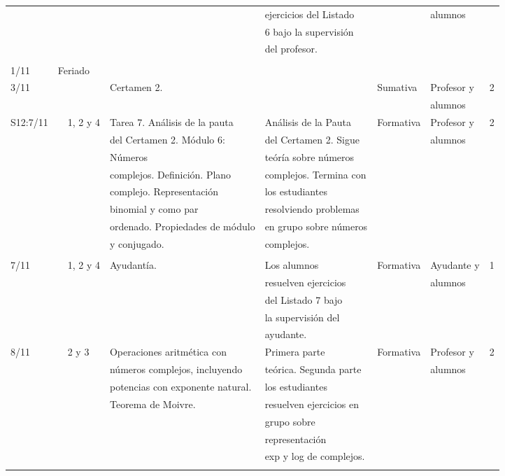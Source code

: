 \documentclass[11pt]{article}
\begin{document}
{\begin{center}
\begin{longtable}{|l|l|l|l|l|l|l|l|}
 & & & & ejercicios del Listado & & alumnos & \\
 & & & & 6 bajo la supervisión & & & \\
 & & & & del profesor. & & & \\
 & & & & & & & \\
\hline
1/11 & \multicolumn{7}{l|}{Feriado} \\
\hline
3/11 & & & Certamen 2. & & Sumativa & Profesor y & 2 \\
 & & & & & & alumnos & \\
\hline
S12:7/11 & & 1, 2 y 4 & Tarea 7. Análisis de la pauta & Análisis de la Pauta & Formativa & Profesor y & 2 \\
 & & & del Certamen 2. Módulo 6: & del Certamen 2. Sigue & & alumnos & \\
 & & & Números & teóría sobre números & & & \\
 & & & complejos. Definición. Plano & complejos. Termina con & & & \\
 & & & complejo. Representación & los estudiantes & & & \\
 & & & binomial y como par & resolviendo problemas & & & \\
 & & & ordenado. Propiedades de módulo & en grupo sobre números & & & \\
 & & & y conjugado. & complejos. & & & \\
 & & & & & & & \\
\hline
7/11 & & 1, 2 y 4 & Ayudantía. & Los alumnos & Formativa & Ayudante y & 1 \\
 & & & & resuelven ejercicios & & alumnos & \\
 & & & & del Listado 7 bajo & & & \\
 & & & & la supervisión del & & & \\
 & & & & ayudante. & & & \\
\hline
8/11 & & 2 y 3 & Operaciones aritmética con & Primera parte & Formativa & Profesor y & 2 \\
 & & & números complejos, incluyendo & teórica. Segunda parte & & alumnos & \\
 & & & potencias con exponente natural. & los estudiantes & & & \\
 & & & Teorema de Moivre. & resuelven ejercicios en & & & \\
 & & & & grupo sobre & & & \\
 & & & & representación & & & \\
 & & & & exp y log de complejos. & & & \\
 & & & & & & & \\

\end{longtable}
\end{center}}
\end{document}
